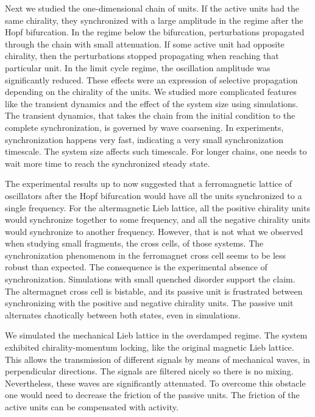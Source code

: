 \documentclass[11pt, a4paper]{article} %
\begin{document}
Next we studied the one-dimensional chain of units. If the active units had the same chirality, they synchronized with a large amplitude 
in the regime after the Hopf bifurcation. In the regime below the bifurcation, perturbations propagated through the chain with 
small attenuation. If some active unit had opposite chirality, then the perturbations stopped propagating when reaching that 
particular unit. In the limit cycle regime, the oscillation amplitude was significantly reduced. These effects were an 
expression of selective propagation depending on the chirality of the units. 
We studied more complicated features like the transient dynamics and the effect of the system size using simulations. 
The transient dynamics, that takes the chain from the initial condition to the complete synchronization, is governed by 
wave coarsening. In experiments, synchronization happens very fast, indicating a very small synchronization timescale. 
The system size affects such timescale. For longer chains, one needs to wait more time to reach the synchronized steady state. 

The experimental results up to now suggested that a ferromagnetic lattice of oscillators after the Hopf bifurcation would have all 
the units synchronized to a single frequency. For the altermagnetic Lieb lattice, all the positive chirality units would synchronize 
together to some frequency, and all the negative chirality units would synchronize to another frequency. 
However, that is not what we observed when studying small fragments, the cross cells, of those systems. 
The synchronization phenomenom in the ferromagnet cross cell seems to be less robust than expected. The consequence 
is the experimental absence of synchronization. Simulations with small quenched disorder support the claim. 
The altermagnet cross cell is bistable, and its passive unit is frustrated 
between synchronizing with the positive and negative chirality units. The passive unit alternates chaotically between both 
states, even in simulations.  

We simulated the mechanical Lieb lattice in the overdamped regime. The system exhibited chirality-momentum locking, 
like the original magnetic Lieb lattice. This allows the transmission of different signals by means of mechanical waves, in 
perpendicular directions. The signals are filtered nicely so there is no mixing. Nevertheless, these waves are 
significantly attenuated. To overcome this obstacle one would need to decrease the friction of the passive units. 
The friction of the active units can be compensated with activity.  
\end{document}
